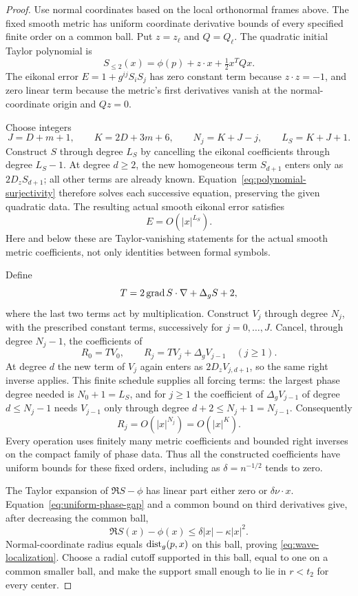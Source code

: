 \begin{proof}
Use normal coordinates based on the local orthonormal frames above.
The fixed smooth metric has uniform coordinate derivative bounds of
every specified finite order on a common ball.  Put $z=z_\ell$ and
$Q=Q_\ell$.  The quadratic initial Taylor polynomial is
\[
 S_{\le2}(x)=\phi(p)+z\cdot x+\tfrac12x^TQx.
\]
The eikonal error $E=1+g^{ij}S_iS_j$ has zero constant term because
$z\cdot z=-1$, and zero linear term because the metric's first
derivatives vanish at the normal-coordinate origin and $Qz=0$.

Choose integers
\[
 J=D+m+1,\qquad K=2D+3m+6,
 \qquad N_j=K+J-j,\qquad L_S=K+J+1.
\]
Construct $S$ through degree $L_S$ by cancelling the eikonal
coefficients through degree $L_S-1$.  At degree $d\ge2$, the new
homogeneous term $S_{d+1}$ enters only as $2D_zS_{d+1}$; all other
terms are already known.  Equation~\eqref{eq:polynomial-surjectivity}
therefore solves each successive equation, preserving the given
quadratic data.  The resulting actual smooth eikonal error satisfies
\[
 E=O(|x|^{L_S}).
\]
Here and below these are Taylor-vanishing statements for the actual
smooth metric coefficients, not only identities between formal symbols.

Define
\[
 T=2\operatorname{grad} S\cdot\nabla+\Delta_gS+2,
\]
where the last two terms act by multiplication.  Construct $V_j$
through degree $N_j$, with the prescribed constant terms, successively
for $j=0,\ldots,J$.  Cancel, through degree $N_j-1$, the coefficients of
\[
 R_0=TV_0,\qquad
 R_j=TV_j+\Delta_gV_{j-1}\quad(j\ge1).
\]
At degree $d$ the new term of $V_j$ again enters as
$2D_z V_{j,d+1}$, so the same right inverse applies.  This finite
schedule supplies all forcing terms: the largest phase degree needed
is $N_0+1=L_S$, and for $j\ge1$ the coefficient of
$\Delta_gV_{j-1}$ of degree $d\le N_j-1$ needs $V_{j-1}$ only through
degree $d+2\le N_j+1=N_{j-1}$.  Consequently
\[
 R_j=O(|x|^{N_j})=O(|x|^K).
\]
Every operation uses finitely many metric coefficients and bounded
right inverses on the compact family of phase data.  Thus all the
constructed coefficients have uniform bounds for these fixed orders,
including as $\delta=n^{-1/2}$ tends to zero.

The Taylor expansion of $\Re S-\phi$ has linear part either zero or
$\delta\nu\cdot x$.  Equation~\eqref{eq:uniform-phase-gap} and a common
bound on third derivatives give, after decreasing the common ball,
\[
 \Re S(x)-\phi(x)\le\delta|x|-\kappa|x|^2.
\]
Normal-coordinate radius equals $\operatorname{dist}_g(p,x)$ on this ball, proving
\eqref{eq:wave-localization}.  Choose a radial cutoff supported
in this ball, equal to one on a common smaller ball, and make the
support small enough to lie in $r<t_2$ for every center.


\end{proof}
